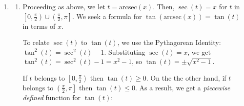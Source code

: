 \documentclass{ximera}
\begin{document}
\begin{example}
\begin{explanation}
\begin{enumerate}
\begin{enumerate}
\item  Since $\frac{5\pi}{4}$ doesn't fall between $0$ and $\frac{\pi}{2}$ or $\frac{\pi}{2}$ and $\pi$, we cannot use the inverse property stated in Theorem \ref{arcsecantcosecantfunctionprops1}. Hence, we work from the `inside out.'



We get:  $\text{arcsec}\left( \sec\left( \frac{5\pi}{4} \right) \right) = \text{arcsec}(-\sqrt{2}) = \arccos\left(-\frac{1}{\sqrt{2}}\right) =\arccos\left(-\frac{\sqrt{2}}{2}\right) = \frac{3\pi}{4}$.

\item  We begin simplifying $\cot\left(\text{arccsc}\left(-3\right)\right)$ by letting $t = \text{arccsc}(-3)$.  Then,  $\csc(t) = -3$. Since $\csc(t) <0$, $t$ lies in the interval  $\left[ -\frac{\pi}{2},0\right)$, so $t$ corresponds to a Quadrant IV angle.

 

To find $\cot\left(\text{arccsc}\left(-3\right)\right) = \cot(t)$, we use the Pythagorean Identity: $\cot^{2}(t) = \csc^{2}(t)-1$.  We get $\csc^{2}(t) = (-3)^2 - 1 = 8$, or $\cot(t) = \pm \sqrt{8} = \pm 2 \sqrt{2}$.  
 
  
 
 Since $t$ corresponds to a Quadrant IV angle,  $\cot(t) < 0$.  Hence,  $\cot\left(\text{arccsc}\left(-3\right)\right) = -2\sqrt{2}$.

\end{enumerate}

\item 

\begin{enumerate}


\item  Proceeding as above, we let $t = \text{arcsec}(x)$.  Then, $\sec(t) = x$ for $t$ in $\left[0, \frac{\pi}{2}\right) \cup \left(\frac{\pi}{2}, \pi \right]$. We seek a formula for $\tan(\text{arcsec}(x)) = \tan(t)$ in terms of $x$.

 

To relate $\sec(t)$ to $\tan(t)$, we use the Pythagorean Identity: $\tan^{2}(t) = \sec^{2}(t) - 1$.   Substituting  $\sec(t) = x$, we get $\tan^{2}(t) = \sec^{2}(t) - 1 = x^2-1$, so $\tan(t) = \pm \sqrt{x^2-1}$. 

 

 If $t$ belongs to $\left[0, \frac{\pi}{2}\right)$ then $\tan(t) \geq 0$.  On  the the other hand, if $t$ belongs to  $\left(\frac{\pi}{2}, \pi \right]$ then $\tan(t) \leq 0$. As a result, we get a \textit{piecewise defined} function for $\tan(t)$:


\end{enumerate}
\end{enumerate}
\end{explanation}
\end{example}
\end{document}
